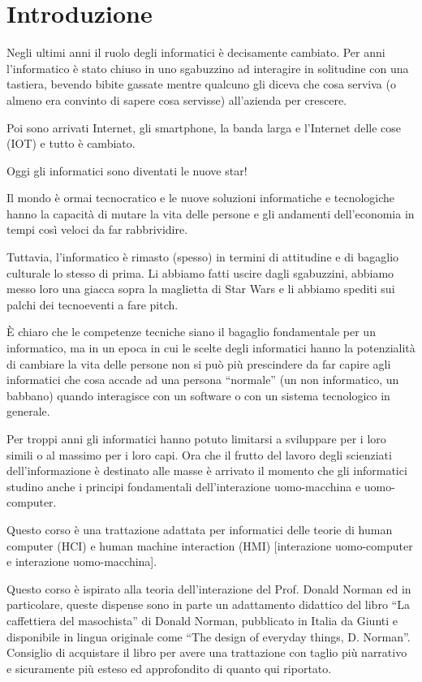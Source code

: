 \chapter{Introduzione}

Negli ultimi anni il ruolo degli informatici è decisamente cambiato. Per anni l'informatico è stato chiuso in uno sgabuzzino ad interagire in solitudine con una tastiera, bevendo bibite gassate mentre qualcuno gli diceva che cosa serviva (o almeno era convinto di sapere cosa servisse) all'azienda per crescere.

Poi sono arrivati Internet, gli smartphone, la banda larga e l'Internet delle cose (IOT) e tutto è cambiato. 

Oggi gli informatici sono diventati le nuove star! 

Il mondo è ormai tecnocratico e le nuove soluzioni informatiche e tecnologiche hanno la capacità di mutare la vita delle persone e gli andamenti dell'economia in tempi così veloci da far rabbrividire.

Tuttavia, l'informatico è rimasto (spesso) in termini di attitudine e di bagaglio culturale lo stesso di prima. Li abbiamo fatti uscire dagli sgabuzzini, abbiamo messo loro una giacca sopra la maglietta di Star Wars e li abbiamo spediti sui palchi dei tecnoeventi a fare pitch.

È chiaro che le competenze tecniche siano il bagaglio fondamentale per un informatico, ma in un epoca in cui le scelte degli informatici hanno la potenzialità di cambiare la vita delle persone non si può più prescindere da far capire agli informatici che cosa accade ad una persona ``normale'' (un non informatico, un babbano) quando interagisce con un software o con un sistema tecnologico in generale. 

Per troppi anni gli informatici hanno potuto limitarsi a sviluppare per i loro simili o al massimo per i loro capi. Ora che il frutto del lavoro degli scienziati dell'informazione è destinato alle masse è arrivato il momento che gli informatici studino anche i principi fondamentali dell'interazione uomo-macchina e uomo-computer.

Questo corso è una trattazione adattata per informatici delle teorie di human computer (HCI) e human machine interaction (HMI) [interazione uomo-computer e interazione uomo-macchina]. 

Questo corso è ispirato alla teoria dell'interazione del Prof. Donald Norman ed in particolare, queste dispense sono in parte un adattamento didattico del libro ``La caffettiera del masochista'' di Donald Norman, pubblicato in Italia da Giunti e disponibile in lingua originale come ``The design of everyday things, D. Norman''. Consiglio di acquistare il libro per avere una trattazione con taglio più narrativo e sicuramente più esteso ed approfondito di quanto qui riportato.

